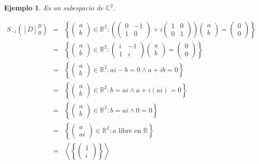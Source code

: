 \documentclass[12pt]{book}
\newtheorem{ejem}{Ejemplo}
\def\R{\mathbb{R}}
\def\C{\mathbb{C}}
\begin{document}
\begin{ejem}
Es un subespacio de $\C^2$.

\begin{eqnarray*}
S_{-i}([D]_B^B)&=&\left\{ \left(\begin{array}{c} a\\b  \end{array}\right)\in\R^2 : 
\left(\left(\begin{matrix} 0&-1 \\ 1&0 \end{matrix}\right)+i\left(\begin{matrix} 1 & 0 \\ 0 & 1   \end{matrix}\right)\right) \left(\begin{array}{c} a  \\ b \end{array}\right)=
\left(\begin{array}{c} 0 \\ 0   \end{array}\right)\right\}\\
&=&\left\{ \left(\begin{array}{c} a\\b  \end{array}\right)\in\R^2 : 
\left(\begin{matrix} i&-1 \\ 1&i \end{matrix}\right) \left(\begin{array}{c} a  \\ b \end{array}\right)=
\left(\begin{array}{c} 0 \\ 0   \end{array}\right)\right\}\\
&=&\left\{ \left(\begin{array}{c} a\\b  \end{array}\right)\in\R^2 : ai-b=0 \wedge a+ib=0\right\}\\
&=&\left\{ \left(\begin{array}{c} a\\b  \end{array}\right)\in\R^2 : b=ai \wedge a+i(ai)=0\right\}\\
&=&\left\{ \left(\begin{array}{c} a\\b  \end{array}\right)\in\R^2 : b=ai \wedge 0=0\right\}\\
&=&\left\{ \left(\begin{array}{c} a\\ai  \end{array}\right)\in\R^2 : a \textrm{ libre  en } \R\right\}\\
&=&\left\langle\left\{\left(\begin{array}{r} 1\\i  \end{array}\right)\right\}\right\rangle
\end{eqnarray*}


\end{ejem}
\end{document}
